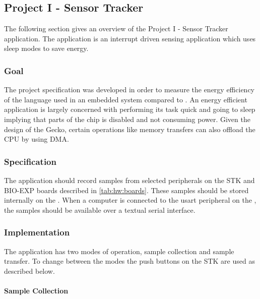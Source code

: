 \subsection{Project I - Sensor Tracker}
\label{sec:impl:project:i}

The following section gives an overview of the Project I - Sensor Tracker application.
The application is an interrupt driven sensing application which uses sleep modes to save energy.

\subsubsection{Goal}
The project specification was developed in order to measure the energy efficiency of the {\rust} language used in an embedded system compared to {\C}.
An energy efficient application is largely concerned with performing its task quick and going to sleep implying that parts of the chip is disabled and not consuming power.
Given the design of the Gecko, certain operations like memory transfers can also offload the CPU by using DMA.


\subsubsection{Specification}

The application should record samples from selected peripherals on the STK and BIO-EXP boards described in \autoref{tab:hw:boards}.
These samples should be stored internally on the {\gecko}.
When a computer is connected to the \gls{usart} peripheral on the {\gecko}, the samples should be available over a textual serial interface.

\subsubsection{Implementation}

The application has two modes of operation, sample collection and sample transfer.
To change between the modes the push buttons on the STK are used as described below.

\paragraph{Sample Collection}

